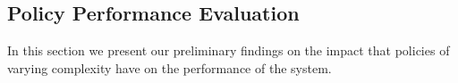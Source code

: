 

	

	

\subsection{Policy Performance Evaluation}


In this section we present our preliminary findings on the impact that
policies of varying complexity have on the performance of the
system. %


